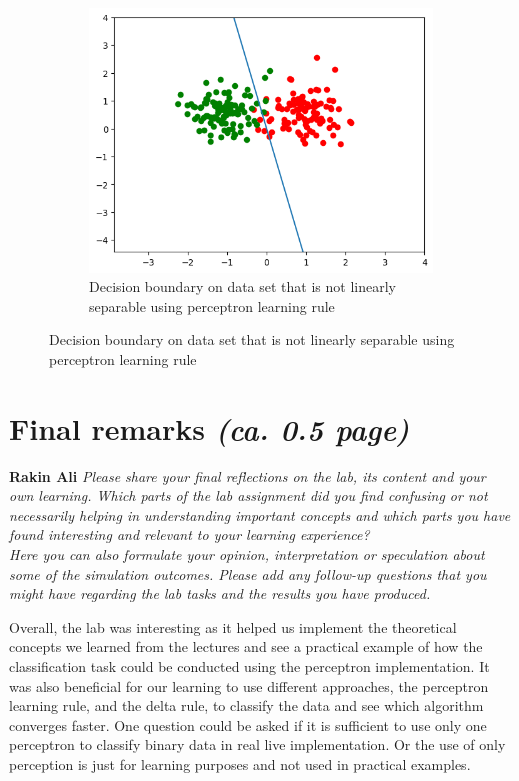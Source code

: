\documentclass[a4paper]{article}
\begin{document}
\begin{figure}[htb]
    \centering
    \begin{subfigure}{0.4\textwidth}
        \includegraphics[width=\textwidth]{Labs/Lab 1/Lab 1a/Results/perceptron_learning_nonLinear_with_bias.png}
        \caption{Decision boundary on data set that is not linearly separable  using perceptron learning rule}
        \label{fig:Decision-boundary-not-linearly-separable}
    \end{subfigure}
    \hfill
\end{figure}





\section{Final remarks \normalsize{\textit{(ca. 0.5 page)}}} \textbf{Rakin Ali }
\textit{Please share your final reflections on the lab, its content and your own learning. Which parts of the lab assignment did you find confusing or not necessarily helping in understanding important concepts and which parts you have found interesting and relevant to your learning experience? \\
Here you can also formulate your opinion, interpretation or speculation about some of the simulation outcomes. Please add any follow-up questions that you might have regarding the lab tasks and the results you have produced.}

Overall, the lab was interesting as it helped us implement the theoretical concepts we learned from the lectures and see a practical example of how the classification task could be conducted using the perceptron implementation. It was also beneficial for our learning to use different approaches, the perceptron learning rule, and the delta rule, to classify the data and see which algorithm converges faster. One question could be asked if it is sufficient to use only one perceptron to classify binary data in real live implementation. Or the use of only perception is just for learning purposes and not used in practical examples. 
\end{document}
